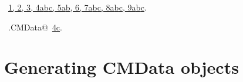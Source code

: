 \documentclass[reqno]{amsart}
\renewcommand{\NWlink}[2]{\hyperlink{#1}{#2}}
\begin{document}
\begin{flushleft}
\begin{list}{}{}
\mbox{}\verb@@{\NWsep}
\end{list}
\vspace{-1.5ex}
\footnotesize
\begin{list}{}{\setlength{\itemsep}{-\parsep}\setlength{\itemindent}{-\leftmargin}}
\item \NWtxtFileDefBy\ \NWlink{nuweb1}{1}\NWlink{nuweb2}{, 2}\NWlink{nuweb3}{, 3}\NWlink{nuweb4a}{, 4a}\NWlink{nuweb4b}{b}\NWlink{nuweb4c}{c}\NWlink{nuweb5a}{, 5a}\NWlink{nuweb5b}{b}\NWlink{nuweb6}{, 6}\NWlink{nuweb7a}{, 7a}\NWlink{nuweb7b}{b}\NWlink{nuweb7c}{c}\NWlink{nuweb8a}{, 8a}\NWlink{nuweb8b}{b}\NWlink{nuweb8c}{c}\NWlink{nuweb9a}{, 9a}\NWlink{nuweb9b}{b}\NWlink{nuweb9c}{c}.
\item \NWtxtIdentsDefed\nobreak\  \verb@unwrap.CMData@\nobreak\ \NWlink{nuweb4c}{4c}.
\item{}
\end{list}
\vspace{4ex}
\end{flushleft}
\section{Generating CMData objects}
\end{document}
